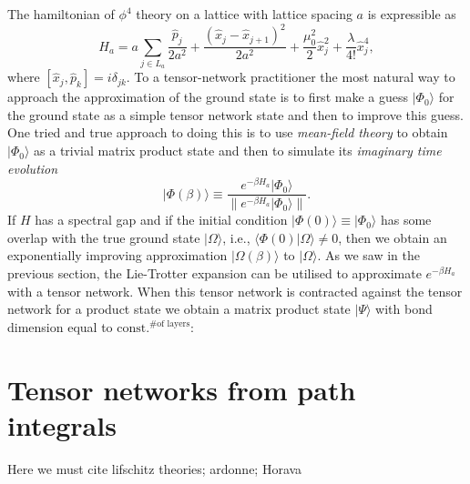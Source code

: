 \documentclass[twocolumn,lengthcheck,superscriptaddress]{revtex4-1}
\theoremstyle{definition}
\theoremstyle{remark}
\begin{document}
The hamiltonian of $\phi^4$ theory on a lattice with lattice spacing $a$ is expressible as 
\begin{equation}
	H_a = a\sum_{j\in L_a} \frac{\widehat{p}_j}{2a^{2}} + \frac{(\widehat{x}_j-\widehat{x}_{j+1})^2}{2a^2} + \frac{\mu_0^2}{2} \widehat{x}_j^2 + \frac{\lambda}{4!} \widehat{x}_j^4,
\end{equation}
where $[\widehat{x}_j, \widehat{p}_k] = i\delta_{jk}$. To a tensor-network practitioner the most natural way to approach the approximation of the ground state is to first make a guess $|\Phi_0\rangle$ for the ground state as a simple tensor network state and then to improve this guess. One tried and true approach to doing this is to use \emph{mean-field theory} to obtain $|\Phi_0\rangle$ as a trivial matrix product state and then to simulate its \emph{imaginary time evolution} 
\begin{equation}
	|\Phi(\beta)\rangle \equiv \frac{e^{-\beta H_a}|\Phi_0\rangle}{\|e^{-\beta H_a}|\Phi_0\rangle\|}.
\end{equation}
If $H$ has a spectral gap and if the initial condition $|\Phi(0)\rangle \equiv |\Phi_0\rangle$ has some overlap with the true ground state $|\Omega\rangle$, i.e., $\langle \Phi(0)|\Omega\rangle \not= 0$, then we obtain an exponentially improving approximation $|\Omega(\beta)\rangle$ to $|\Omega\rangle$.
As we saw in the previous section, the Lie-Trotter expansion can be utilised to approximate $e^{-\beta H_a}$  with a tensor network. When this tensor network is contracted against the tensor network for a product state we obtain a matrix product state $|\Psi\rangle$ with bond dimension equal to $\text{const.}^{\text{\# of layers}}$:


\section{Tensor networks from path integrals}

Here we must cite lifschitz theories; ardonne; Horava
\end{document}
